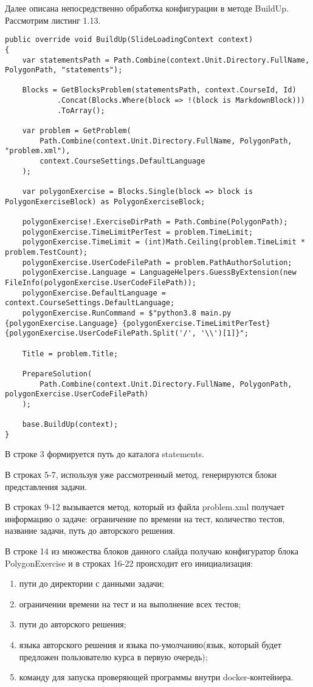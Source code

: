 Далее описана непосредственно обработка конфигурации в методе BuildUp. Рассмотрим листинг 1.13. 

\begin{lstlisting}[caption={Обработка конфигурации в PolygonExerciseSlide}]
public override void BuildUp(SlideLoadingContext context)
{
	var statementsPath = Path.Combine(context.Unit.Directory.FullName, PolygonPath, "statements");
			
	Blocks = GetBlocksProblem(statementsPath, context.CourseId, Id)
			.Concat(Blocks.Where(block => !(block is MarkdownBlock)))
			.ToArray();
			
	var problem = GetProblem(
		Path.Combine(context.Unit.Directory.FullName, PolygonPath, "problem.xml"), 
		context.CourseSettings.DefaultLanguage
	);

	var polygonExercise = Blocks.Single(block => block is PolygonExerciseBlock) as PolygonExerciseBlock;
			
	polygonExercise!.ExerciseDirPath = Path.Combine(PolygonPath);
	polygonExercise.TimeLimitPerTest = problem.TimeLimit;
	polygonExercise.TimeLimit = (int)Math.Ceiling(problem.TimeLimit * problem.TestCount);
	polygonExercise.UserCodeFilePath = problem.PathAuthorSolution;
	polygonExercise.Language = LanguageHelpers.GuessByExtension(new FileInfo(polygonExercise.UserCodeFilePath));
	polygonExercise.DefaultLanguage = context.CourseSettings.DefaultLanguage;
	polygonExercise.RunCommand = $"python3.8 main.py {polygonExercise.Language} {polygonExercise.TimeLimitPerTest} {polygonExercise.UserCodeFilePath.Split('/', '\\')[1]}";
			
	Title = problem.Title;
			
	PrepareSolution(
    	Path.Combine(context.Unit.Directory.FullName, PolygonPath, polygonExercise.UserCodeFilePath)
	);

	base.BuildUp(context);
}

\end{lstlisting}

В строке 3 формируется путь до каталога statements.

В строках 5-7, используя уже рассмотренный метод, генерируются блоки представления задачи.

В строках 9-12 вызывается метод, который из файла problem.xml получает информацию о задаче: ограничение по времени на тест, количество тестов, название задачи, путь до авторского решения. 

В строке 14 из множества блоков данного слайда получаю конфигуратор блока PolygonExercise и в строках 16-22 происходит его инициализация:
\begin{enumerate}
    \item пути до директории с данными задачи;
    \item ограничении времени на тест и на выполнение всех тестов;
    \item пути до авторского решения;
    \item языка авторского решения и языка по-умолчанию(язык, который будет предложен пользователю курса в первую очередь);
    \item команду для запуска проверяющей программы внутри docker-контейнера.
\end{enumerate}

